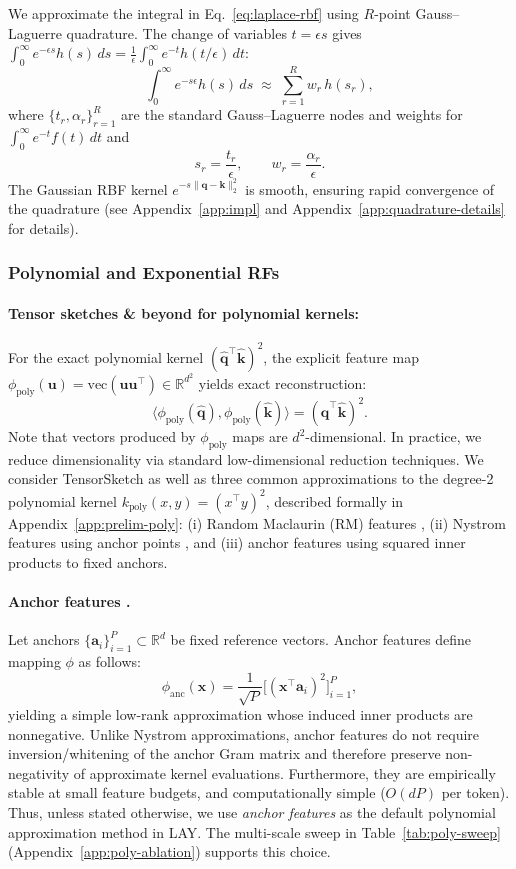 \documentclass{article}
\newcommand{\R}{\mathbb{R}}
\begin{document}
We approximate the integral in Eq.~\eqref{eq:laplace-rbf} using $R$-point Gauss--Laguerre quadrature. The change of variables $t = \epsilon s$ gives $\int_0^\infty e^{-\epsilon s} h(s)\,ds = \frac{1}{\epsilon}\int_0^\infty e^{-t} h(t/\epsilon)\,dt$:
\[
\int_0^\infty e^{-s\epsilon} h(s)\,ds \;\approx\; \sum_{r=1}^R w_r\, h(s_r),
\]
where $\{t_r,\alpha_r\}_{r=1}^R$ are the standard Gauss--Laguerre nodes and weights for $\int_0^\infty e^{-t}f(t)\,dt$ and
\[
s_r=\frac{t_r}{\epsilon},\qquad w_r=\frac{\alpha_r}{\epsilon}.
\]
The Gaussian RBF kernel $e^{-s\|\mathbf{q}-\mathbf{k}\|_{2}^2}$ is smooth, ensuring rapid convergence of the quadrature (see Appendix~\ref{app:impl} and Appendix~\ref{app:quadrature-details} for details).

\subsubsection{Polynomial and Exponential RFs}
\label{sec:poly-exp-rfs}

\paragraph{Tensor sketches \& beyond for polynomial kernels:}
For the exact polynomial kernel $(\widehat{\mathbf{q}}^\top \widehat{\mathbf{k}})^2$, the explicit feature map $\phi_{\text{poly}}(\mathbf{u}) = \mathrm{vec}(\mathbf{u} \mathbf{u}^\top) \in \R^{d^2}$ yields exact reconstruction:
\[
\langle \phi_{\text{poly}}(\widehat{\mathbf{q}}), \phi_{\text{poly}}(\widehat{\mathbf{k}}) \rangle = (\widehat{\mathbf{q}}^\top \widehat{\mathbf{k}})^2.
\]
Note that vectors produced by $\phi_{\mathrm{poly}}$ maps are $d^{2}$-dimensional. In practice, we reduce dimensionality via standard low-dimensional reduction techniques. We consider TensorSketch \citep{pham2013} as well as three common approximations to the degree-2 polynomial kernel $k_{\text{poly}}(x,y)=(x^\top y)^2$, described formally in Appendix~\ref{app:prelim-poly}: (i) Random Maclaurin (RM) features \citep{karkarnick2012}, (ii) Nystrom features using anchor points \citep{williams2001nystrom}, and (iii) anchor features using squared inner products to fixed anchors.

\paragraph{Anchor features \citep{scholkopf2002learning}.}
Let anchors $\{\mathbf{a}_i\}_{i=1}^P\subset\R^d$ be fixed reference vectors. Anchor features define mapping $\phi$ as follows:
\[
\phi_{\mathrm{anc}}(\mathbf{x}) = \frac{1}{\sqrt{P}}\bigl[(\mathbf{x}^\top \mathbf{a}_i)^2\bigr]_{i=1}^P,
\]
yielding a simple low-rank approximation whose induced inner products are nonnegative. Unlike Nystrom approximations, anchor features do not require inversion/whitening of the anchor Gram matrix and therefore preserve non-negativity of approximate kernel evaluations. Furthermore, they are empirically stable at small feature budgets, and computationally simple ($O(dP)$ per token). Thus, unless stated otherwise, we use \emph{anchor features} as the default polynomial approximation method in LAY. The multi-scale sweep in Table~\ref{tab:poly-sweep} (Appendix~\ref{app:poly-ablation}) supports this choice.
\end{document}
